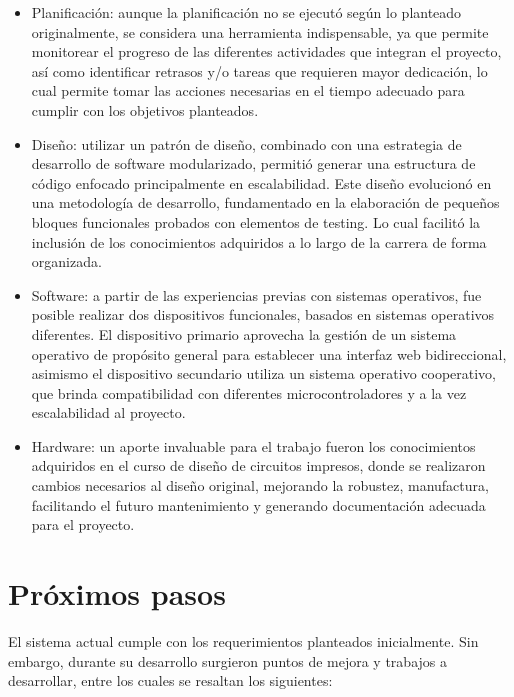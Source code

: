 \begin{itemize}
\item Planificación: aunque la planificación no se ejecutó según lo planteado originalmente, se considera una herramienta indispensable, ya que permite monitorear el progreso de las diferentes actividades que  integran el proyecto, así como identificar  retrasos  y/o  tareas que requieren mayor dedicación, lo cual permite  tomar las acciones necesarias en el tiempo adecuado para cumplir con los objetivos planteados.
\item Diseño: utilizar un patrón de diseño, combinado con una estrategia de desarrollo de software modularizado, permitió generar una estructura de código enfocado principalmente en escalabilidad. Este diseño evolucionó en una metodología de desarrollo, fundamentado en la elaboración de pequeños bloques funcionales probados con elementos de testing. Lo cual facilitó la inclusión de los conocimientos adquiridos a lo largo de la carrera de forma organizada.  
\item Software: a partir de las experiencias previas con sistemas operativos, fue posible realizar dos dispositivos funcionales, basados en sistemas operativos diferentes. El dispositivo primario aprovecha la gestión de un sistema operativo de propósito general para establecer una interfaz web bidireccional, asimismo el dispositivo secundario utiliza un sistema operativo cooperativo, que brinda compatibilidad con diferentes microcontroladores y a la vez escalabilidad al proyecto.   
\item Hardware: un aporte invaluable para el trabajo fueron los conocimientos adquiridos en el curso de diseño de circuitos impresos, donde se realizaron cambios necesarios al diseño original, mejorando la robustez, manufactura, facilitando el futuro mantenimiento y generando documentación adecuada para el proyecto.
\end{itemize}


\section{Próximos pasos}

El sistema actual cumple con los requerimientos planteados inicialmente. Sin embargo, durante su desarrollo surgieron puntos de mejora y trabajos a desarrollar, entre los cuales se resaltan los siguientes:

